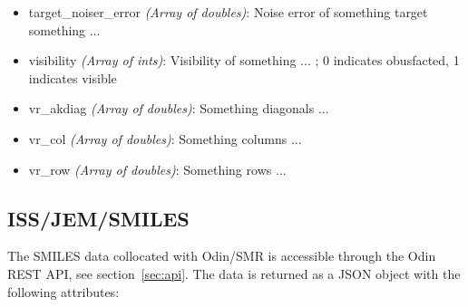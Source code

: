 \begin{itemize}
    \item target\_noiser\_error \emph{(Array of doubles)}: Noise error of
        something target something ... 
    \item visibility \emph{(Array of ints)}: Visibility of something ...
        ; 0 indicates obusfacted, 1 indicates visible
    \item vr\_akdiag \emph{(Array of doubles)}: Something diagonals ...
    \item vr\_col \emph{(Array of doubles)}: Something columns ... 
    \item vr\_row \emph{(Array of doubles)}: Something rows ... 
\end{itemize}

\subsection{ISS/JEM/SMILES}
The SMILES data collocated with Odin/SMR is accessible through the Odin REST
API, see section~\ref{sec:api}. The data is returned as a JSON object with the
following attributes:
